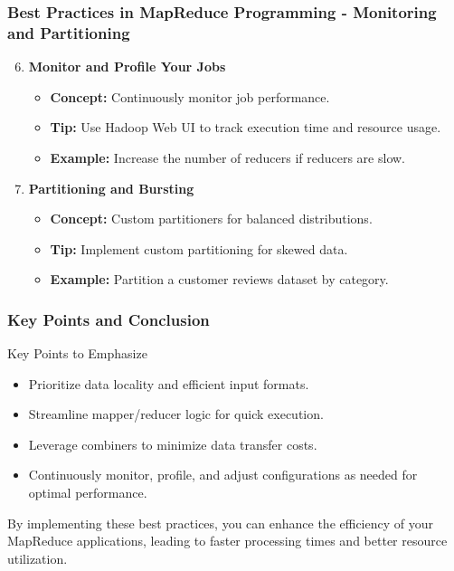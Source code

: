 \documentclass[aspectratio=169]{beamer}
\begin{document}
\begin{frame}[fragile]
    \frametitle{Best Practices in MapReduce Programming - Monitoring and Partitioning}
    \begin{enumerate}
        \setcounter{enumi}{5}
        \item \textbf{Monitor and Profile Your Jobs}
            \begin{itemize}
                \item \textbf{Concept:} Continuously monitor job performance.
                \item \textbf{Tip:} Use Hadoop Web UI to track execution time and resource usage.
                \item \textbf{Example:} Increase the number of reducers if reducers are slow.
            \end{itemize}

        \item \textbf{Partitioning and Bursting}
            \begin{itemize}
                \item \textbf{Concept:} Custom partitioners for balanced distributions.
                \item \textbf{Tip:} Implement custom partitioning for skewed data.
                \item \textbf{Example:} Partition a customer reviews dataset by category.
            \end{itemize}
    \end{enumerate}
\end{frame}

\begin{frame}[fragile]
    \frametitle{Key Points and Conclusion}
    \begin{block}{Key Points to Emphasize}
        \begin{itemize}
            \item Prioritize data locality and efficient input formats.
            \item Streamline mapper/reducer logic for quick execution.
            \item Leverage combiners to minimize data transfer costs.
            \item Continuously monitor, profile, and adjust configurations as needed for optimal performance.
        \end{itemize}
    \end{block}
    By implementing these best practices, you can enhance the efficiency of your MapReduce applications, leading to faster processing times and better resource utilization.
\end{frame}
\end{document}

